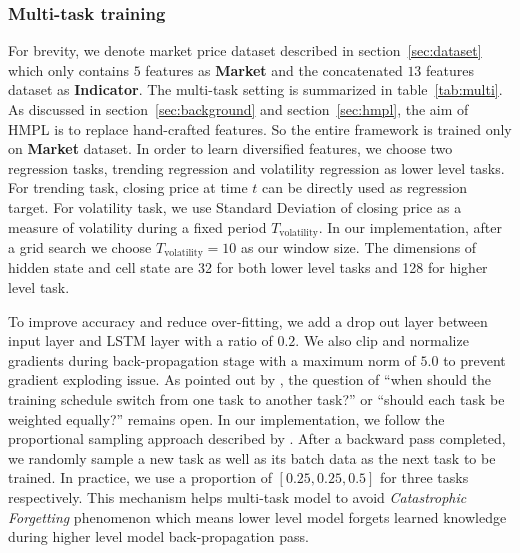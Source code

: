 \documentclass[sigconf, anonymous, review]{acmart}
\renewcommand{\citename}{\citet}
\begin{document}
\subsubsection{Multi-task training}
\label{sec:multi_train}

For brevity, we denote market price dataset described in
section~\ref{sec:dataset} which only contains $5$ features as
\textbf{Market} and the concatenated $13$ features dataset as
\textbf{Indicator}. The multi-task setting is summarized in
table~\ref{tab:multi}. As discussed in
section~\ref{sec:background} and section~\ref{sec:hmpl}, the aim
of HMPL is to replace hand-crafted features. So the entire
framework is trained only on \textbf{Market} dataset. In order to
learn diversified features, we choose two regression tasks,
trending regression and volatility regression as lower level
tasks. For trending task, closing price at time $t$ can be
directly used as regression target. For volatility task, we use
Standard Deviation of closing price as a measure of volatility
during a fixed period $T_{\text{volatility}}$. In our
implementation, after a grid search we choose
$T_{\text{volatility}}=10$ as our window size. The dimensions of
hidden state and cell state are 32 for both lower level tasks and
128 for higher level task.

To improve accuracy and reduce over-fitting, we add a drop out
layer between input layer and LSTM layer with a ratio of $0.2$.
We also clip and normalize gradients during back-propagation
stage with a maximum norm of $5.0$ to prevent gradient exploding
issue. As pointed out by \citename{lample2016neural}, the
question of ``when should the training schedule switch from one
task to another task?'' or ``should each task be weighted
equally?'' remains open. In our implementation, we follow the
proportional sampling approach described by
\citename{sogaard2016deep}. After a backward pass completed, we
randomly sample a new task as well as its batch data as the next
task to be trained. In practice, we use a proportion of
$[0.25,0.25,0.5]$ for three tasks respectively. This mechanism
helps multi-task model to avoid \emph{Catastrophic Forgetting}
phenomenon which means lower level model forgets learned
knowledge during higher level model back-propagation pass.
\end{document}
